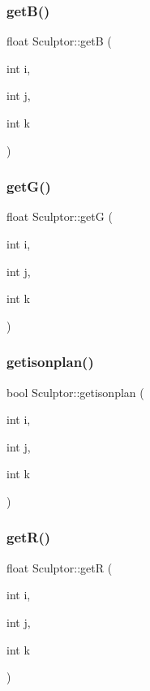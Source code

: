 \subsubsection{\texorpdfstring{get\+B()}{getB()}}
{\footnotesize\ttfamily float Sculptor\+::getB (\begin{DoxyParamCaption}\item[{int}]{i,  }\item[{int}]{j,  }\item[{int}]{k }\end{DoxyParamCaption})}

\mbox{\label{class_sculptor_a82bade484b1942db03407888b0821791}} 
\subsubsection{\texorpdfstring{get\+G()}{getG()}}
{\footnotesize\ttfamily float Sculptor\+::getG (\begin{DoxyParamCaption}\item[{int}]{i,  }\item[{int}]{j,  }\item[{int}]{k }\end{DoxyParamCaption})}

\mbox{\label{class_sculptor_ad7793360e2d6a11c4799b50e3cfaf017}} 
\subsubsection{\texorpdfstring{getisonplan()}{getisonplan()}}
{\footnotesize\ttfamily bool Sculptor\+::getisonplan (\begin{DoxyParamCaption}\item[{int}]{i,  }\item[{int}]{j,  }\item[{int}]{k }\end{DoxyParamCaption})}

\mbox{\label{class_sculptor_a6ddea4b268d77d46085313a09746176b}} 
\subsubsection{\texorpdfstring{get\+R()}{getR()}}
{\footnotesize\ttfamily float Sculptor\+::getR (\begin{DoxyParamCaption}\item[{int}]{i,  }\item[{int}]{j,  }\item[{int}]{k }\end{DoxyParamCaption})}

